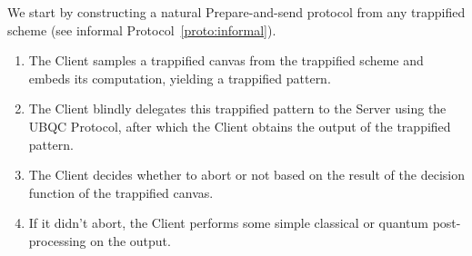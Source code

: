 \documentclass[12pt]{iopart}
\renewcommand{\1}{\mathds{1}}
\begin{document}
We start by constructing a natural Prepare-and-send protocol from any trappified scheme (see informal Protocol~\ref{proto:informal}). 
\begin{protocol}[ht]
  \caption{Trappified Delegated Blind Computation Protocol (Informal)}
  \label{proto:informal}
    \begin{enumerate}
    	\item The Client samples a trappified canvas from the trappified scheme and embeds its computation, yielding a trappified pattern.
	    \item The Client blindly delegates this trappified pattern to the Server using the UBQC Protocol, after which the Client obtains the output of the trappified pattern.
	    \item The Client decides whether to abort or not based on the result of the decision function of the trappified canvas.
	    \item If it didn't abort, the Client performs some simple classical or quantum post-processing on the output.
    \end{enumerate}
\end{protocol}
\end{document}

